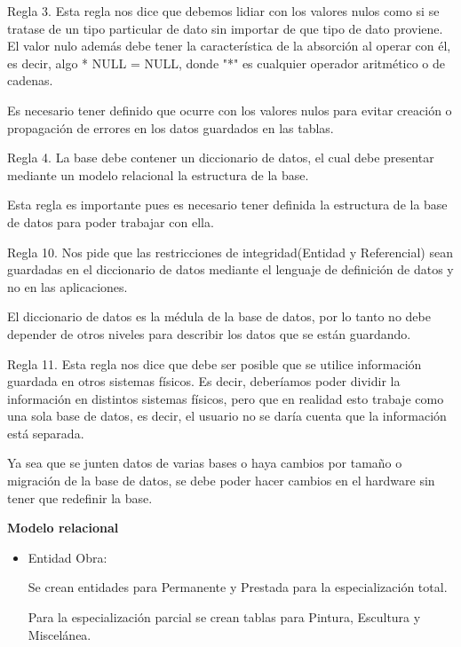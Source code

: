 \documentclass{exam}
\begin{document}
\begin{questions}
\begin{enumerate}[label=(\roman*)]
        Regla 3. Esta regla nos dice que debemos lidiar con los valores nulos como si se tratase de un tipo particular de dato sin importar de que tipo de dato proviene.  El valor nulo además debe tener la característica de la absorción al operar con él, es decir, algo * NULL = NULL, donde "*" es cualquier operador aritmético o de cadenas.
        
        Es necesario tener definido que ocurre con los valores nulos para evitar creación o propagación de errores en los datos guardados en las tablas. 
        
        Regla 4. La base debe contener un diccionario de datos, el cual debe presentar mediante un modelo relacional la estructura de la base.
        
        Esta regla es importante pues es necesario tener definida la estructura de la base de datos para poder trabajar con ella.
        
        Regla 10. Nos pide que las restricciones de integridad(Entidad y Referencial) sean guardadas en el diccionario de datos mediante el lenguaje de definición de datos y no en las aplicaciones. 
        
        El diccionario de datos es la médula de la base de datos, por lo tanto no debe depender de otros niveles para describir los datos que se están guardando.
        
        Regla 11. Esta regla nos dice que debe ser posible que se utilice información guardada en otros sistemas físicos. Es decir, deberíamos poder dividir la información en distintos sistemas físicos, pero que en realidad esto trabaje como una sola base de datos, es decir, el usuario no se daría cuenta que la información está separada.
        
        Ya sea que se junten datos de varias bases o haya cambios por tamaño o migración de la base de datos, se debe poder hacer cambios en el hardware sin tener que redefinir la base.


	\end{enumerate}
	
	\question \textbf{Modelo relacional}
	
	\begin{itemize}
	    \item Entidad Obra:
	
	Se crean entidades para Permanente y Prestada para la especialización total.
	
	Para la especialización parcial se crean tablas para Pintura, Escultura y Miscelánea.
	

\end{itemize}
\end{questions}
\end{document}
